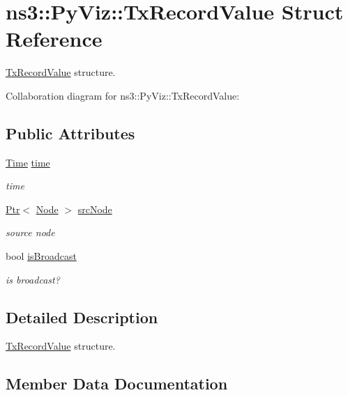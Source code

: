 \hypertarget{structns3_1_1PyViz_1_1TxRecordValue}{}\section{ns3\+:\+:Py\+Viz\+:\+:Tx\+Record\+Value Struct Reference}
\label{structns3_1_1PyViz_1_1TxRecordValue}


\hyperlink{structns3_1_1PyViz_1_1TxRecordValue}{Tx\+Record\+Value} structure.  




Collaboration diagram for ns3\+:\+:Py\+Viz\+:\+:Tx\+Record\+Value\+:
\subsection*{Public Attributes}
\begin{DoxyCompactItemize}
\item 
\hyperlink{classns3_1_1Time}{Time} \hyperlink{structns3_1_1PyViz_1_1TxRecordValue_a4617fed3b591689ee1a1bc855fd0b14a}{time}
\begin{DoxyCompactList}\small\item\em time \end{DoxyCompactList}\item 
\hyperlink{classns3_1_1Ptr}{Ptr}$<$ \hyperlink{classns3_1_1Node}{Node} $>$ \hyperlink{structns3_1_1PyViz_1_1TxRecordValue_a00e3ea0ee813004f2dfae5b7b4c33ce0}{src\+Node}
\begin{DoxyCompactList}\small\item\em source node \end{DoxyCompactList}\item 
bool \hyperlink{structns3_1_1PyViz_1_1TxRecordValue_a24c3b95b8c41c5d24f23ad119ec89158}{is\+Broadcast}
\begin{DoxyCompactList}\small\item\em is broadcast? \end{DoxyCompactList}\end{DoxyCompactItemize}


\subsection{Detailed Description}
\hyperlink{structns3_1_1PyViz_1_1TxRecordValue}{Tx\+Record\+Value} structure. 

\subsection{Member Data Documentation}
